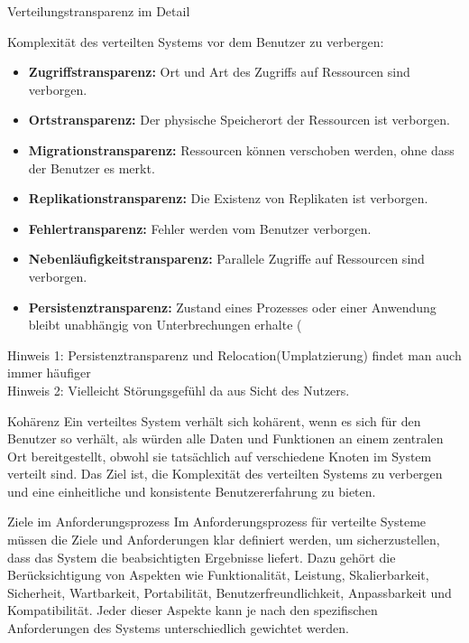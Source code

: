 \documentclass{beamer}
\begin{document}
\begin{frame}{Verteilungstransparenz im Detail}

Komplexität des verteilten Systems vor dem Benutzer zu verbergen:

    \begin{itemize}
        \item \textbf{Zugriffstransparenz:}  Ort und Art des Zugriffs auf Ressourcen sind verborgen.
        \item \textbf{Ortstransparenz:} Der physische Speicherort der Ressourcen ist verborgen.
        \item \textbf{Migrationstransparenz:}  Ressourcen können verschoben werden, ohne dass der Benutzer es merkt.
        \item \textbf{Replikationstransparenz:}  Die Existenz von Replikaten ist verborgen.
        \item \textbf{Fehlertransparenz:}  Fehler werden vom Benutzer verborgen.
        \item \textbf{Nebenläufigkeitstransparenz:} Parallele Zugriffe auf Ressourcen sind verborgen.
        \item \textbf{Persistenztransparenz: }  Zustand eines Prozesses oder einer Anwendung bleibt unabhängig von Unterbrechungen erhalte (
    \end{itemize}
    Hinweis 1: Persistenztransparenz und Relocation(Umplatzierung) findet man auch immer häufiger\\
    Hinweis 2: Vielleicht Störungsgefühl da aus Sicht des Nutzers. 
\end{frame}


\begin{frame}{Kohärenz}
  Ein verteiltes System verhält sich kohärent, wenn es sich für den Benutzer so verhält, als würden alle Daten und Funktionen an einem zentralen Ort bereitgestellt, obwohl sie tatsächlich auf verschiedene Knoten im System verteilt sind.  Das Ziel ist, die Komplexität des verteilten Systems zu verbergen und eine einheitliche und konsistente Benutzererfahrung zu bieten.
\end{frame}



\begin{frame}{Ziele im Anforderungsprozess}
    Im Anforderungsprozess für verteilte Systeme müssen die Ziele und Anforderungen klar definiert werden, um sicherzustellen, dass das System die beabsichtigten Ergebnisse liefert.  Dazu gehört die Berücksichtigung von Aspekten wie Funktionalität, Leistung, Skalierbarkeit, Sicherheit, Wartbarkeit, Portabilität, Benutzerfreundlichkeit, Anpassbarkeit und Kompatibilität.  Jeder dieser Aspekte kann je nach den spezifischen Anforderungen des Systems unterschiedlich gewichtet werden.
\end{frame}
\end{document}

